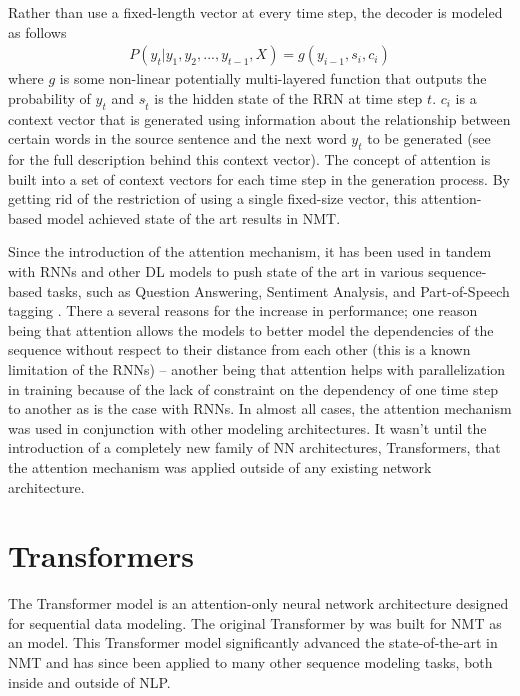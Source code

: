 Rather than use a fixed-length vector at every time step, the decoder is modeled as follows 
\begin{align*}
P(y_t \vert y_1, y_2, ..., y_{t-1}, X) = g(y_{i-1}, s_i, c_i)    
\end{align*}
where $g$ is some non-linear potentially multi-layered function that outputs the probability of $y_{t}$ and $s_{\hat{t}}$ is the hidden state of the RRN at time step $t$. $c_i$ is a context vector that is generated using information about the relationship between certain words in the source sentence and the next word $y_t$ to be generated (see \citet{bahdanau2014neural} for the full description behind this context vector). The concept of attention is built into a set of context vectors for each time step in the generation process. By getting rid of the restriction of using a single fixed-size vector, this attention-based model achieved state of the art results in NMT. 

Since the introduction of the attention mechanism, it has been used in tandem with RNNs and other DL models to push state of the art in various sequence-based tasks, such as Question Answering, Sentiment Analysis, and Part-of-Speech tagging \cite{chaudhari2019attentive}. There a several reasons for the increase in performance; one reason being that attention allows the models to better model the dependencies of the sequence without respect to their distance from each other (this is a known limitation of the RNNs) \cite{vaswani2017attention} -- another being that attention helps with parallelization in training because of the lack of constraint on the dependency of one time step to another as is the case with RNNs. In almost all cases, the attention mechanism was used in conjunction with other modeling architectures. It wasn't until the introduction of a completely new family of NN architectures, Transformers, that the attention mechanism was applied outside of any existing network architecture.


\section{Transformers}
The Transformer model is an attention-only neural network architecture designed for sequential data modeling. The original Transformer by \citet{vaswani2017attention} was built for NMT as an \ed{} model. This Transformer model significantly advanced the state-of-the-art in NMT and has since been applied to many other sequence modeling tasks, both inside and outside of NLP. 
\newcommand{\mb}[1]{\mathbf{#1}}

